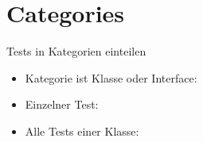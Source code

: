 {
\date{Piet Mondrian, Composition with Gray and Light Brown}
\part{Categories}
}

\begin{frame}{Tests in Kategorien einteilen}
	\begin{itemize}
		\item Kategorie ist Klasse oder Interface:
		\item Einzelner Test:
		\item Alle Tests einer Klasse:
	\end{itemize}
\end{frame}

